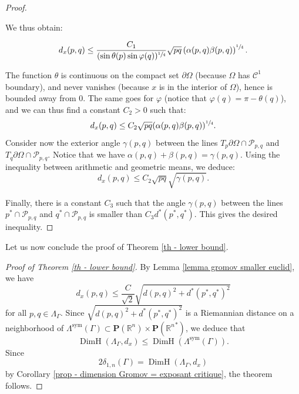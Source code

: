 \documentclass[JEP,XML,SOM,Unicode,NoEqCountersInSection,NoFloatCountersInSection,published]{cedram}
\theoremstyle{definition}
\newcommand{\proj}{\mathbf{P}}
\newcommand{\R}{\mathbb{R}}
\DeclareMathOperator{\DimH}{DimH}
\let\p\varphi
\let\G\Gamma
\begin{document}
\begin{proof}
\begin{figure}[htb]
\caption{}
\label{figure angles gromov distance}
\end{figure}

We thus obtain:

\[ d_x(p,q) \leq \frac{C_1}{(\sin \theta(p) \sin \p(q))^{\sfrac{1}{4}}} \sqrt{pq} \left( \alpha(p,q)\beta(p,q) \right)^{\sfrac{1}{4}}. \]

The function $\theta$ is continuous on the compact set $\partial \Omega$ (because $\Omega$ has $\mathcal C^1$ boundary), and never vanishes (because $x$ is in the interior of $\Omega$), hence is bounded away from $0$. The same goes for $\p$ (notice that $\p(q)=\pi-\theta(q)$), and we can thus find a constant $C_2>0$ such that:
\[ d_x(p,q)\leq C_2 \sqrt{pq} (\alpha(p,q)\beta(p,q))^{\sfrac{1}{4}}.\]
Consider now the exterior angle $\gamma(p,q)$ between the lines $T_p\partial\Omega \cap \mathcal P_{p,q}$ and $T_q\partial\Omega \cap \mathcal P_{p,q}$.
Notice that we have $\alpha(p,q)+\beta(p,q)=\gamma(p,q)$. Using the inequality between arithmetic and geometric means, we deduce:
\[ d_x(p,q)\leq C_2 \sqrt{pq} \sqrt{\gamma(p,q)}. \]

Finally, there is a constant $C_3$ such that the angle $\gamma(p,q)$ between the lines $p^*\cap \mathcal P_{p,q}$ and $q^* \cap \mathcal P_{p,q}$ is smaller than $C_3 d^*(p^*,q^*)$. This gives the desired inequality.
\end{proof}

Let us now conclude the proof of Theorem \ref{th - lower bound}.

\begin{proof}[Proof of Theorem \ref{th - lower bound}]
By Lemma \ref{lemma gromov smaller euclid}, we have
\[d_x(p,q) \leq \frac{C}{\sqrt{2}}\sqrt{d(p,q)^2 + d^*(p^*,q^*)^2}\]
for all $p,q \in \Lambda_\Gamma$. Since $\sqrt{d(p,q)^2 + d^*(p^*,q^*)^2}$ is a Riemannian distance on a neighborhood of $\Lambda^{\mathrm{sym}}(\G) \subset \proj(\R^n) \times \proj({\R^n}^*)$, we deduce that
\[\DimH(\Lambda_\G, d_x) \leq \DimH(\Lambda^{\mathrm{sym}}(\G)).\]
Since
\[2\delta_{1,n}(\G) = \DimH(\Lambda_\G, d_x)\]
by Corollary \ref{prop - dimension Gromov = exposant critique}, the theorem follows.
\end{proof}
\end{document}
